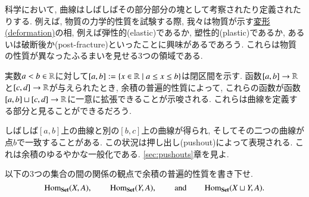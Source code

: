\begin{application}


科学において, 曲線はしばしばその部分部分の塊として考察されたり定義されたりする. 例えば, 物質の力学的性質を試験する際, 我々は物質が示す\href{http://en.wikipedia.org/wiki/Deformation_(engineering)}{変形(deformation)}の相, 例えば弾性的(elastic)であるか, 塑性的(plastic)であるか, あるいは破断後か(post-fracture)といったことに興味があるであろう.  これらは物質の性質が異なったふるまいを見せる3つの領域である.


実数$a<b\in{\mathbb R}$に対して$[a,b]:=\{x\in{\mathbb R}{\;|\;}a\leq x\leq b\}$は閉区間を示す. 函数$[a,b]\rightarrow{\mathbb R}$と$[c,d]\rightarrow{\mathbb R}$が与えられたとき, 余積の普遍的性質によって, これらの函数が函数$[a,b]\sqcup[c,d]\rightarrow{\mathbb R}$に一意に拡張できることが示唆される. これらは曲線を定義する部分と見ることができるだろう.


しばしば$[a,b]$上の曲線と別の$[b,c]$上の曲線が得られ, そしてその二つの曲線が点$b$で一致することがある. この状況は押し出し(pushout)によって表現される. これは余積のゆるやかな一般化である. \ref{sec:pushouts}章を見よ.

\end{application}

\begin{exercise}\label{exc:coprod}


以下の3つの集合の間の関係の観点で余積の普遍的性質を書き下せ. $$\Hom_{\Set}(X,A), \hsp \Hom_\Set(Y,A), \hsp \text{and} \hsp\Hom_\Set(X\sqcup Y,A).$$ 
\end{exercise}

